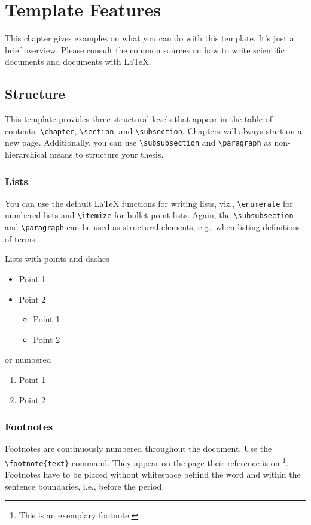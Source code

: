 \chapter{Template Features}
This chapter gives examples on what you can do with this template. It's just a brief overview. Please consult the common sources on how to write scientific documents and documents with \LaTeX.

\section{Structure}
This template provides three structural levels that appear in the table of contents: \texttt{\textbackslash chapter}, \texttt{\textbackslash section}, and \texttt{\textbackslash subsection}. Chapters will always start on a new page. Additionally, you can use \texttt{\textbackslash subsubsection} and \texttt{\textbackslash paragraph} as non-hierarchical means to structure your thesis.


\subsection{Lists}
You can use the default \LaTeX \- functions for writing lists, viz., \texttt{\textbackslash enumerate} for numbered lists and \texttt{\textbackslash itemize} for bullet point lists. Again, the \texttt{\textbackslash subsubsection} and \texttt{\textbackslash paragraph} can be used as structural elements, e.g., when listing definitions of terms.

Lists with points and dashes
\begin{itemize}
\item Point 1
\item Point 2
    \begin{itemize}
    \item Point 1
    \item Point 2
    \end{itemize}
\end{itemize}

or numbered
\begin{enumerate}
\item Point 1
\item Point 2
\end{enumerate}

\subsection{Footnotes}
Footnotes are continuously numbered throughout the document. Use the \texttt{\textbackslash footnote\{text\}} command.  They appear on the page their reference is on \footnote{This is an exemplary footnote.}. Footnotes have to be placed without whitespace behind the word and within the sentence boundaries, i.e., before the period.

